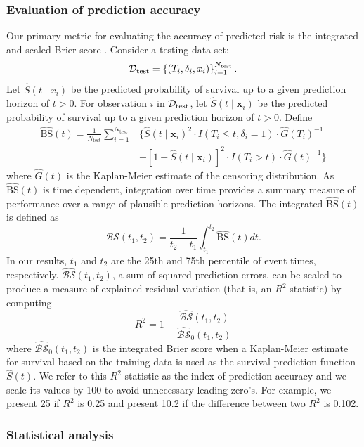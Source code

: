 \documentclass[twoside,11pt]{article}\usepackage[]{graphicx}\usepackage[]{xcolor}
\newcommand{\dataset}{{\cal D}}
\newcommand{\ie}{that is}
\newcommand{\bstat}{\widehat{\text{BS}}(t)}
\newcommand{\bsbar}{\mathcal{\widehat{BS}}(t_1, t_2)}
\newcommand{\bskap}{\mathcal{\widehat{BS}}_0(t_1, t_2)}
\newcommand{\ntest}{N_{\text{test}}}
\begin{document}
\subsubsection{Evaluation of prediction accuracy} \label{sec:prediction_accuracy}

Our primary metric for evaluating the accuracy of predicted risk is the integrated and scaled Brier score \citep{graf1999assessment}. Consider a testing data set:
$$\dataset_{\text{test}} = \left\{ (T_i, \delta_i, x_{i}) \right\}_{i=1}^{N_{\text{test}}}.$$
Let $\widehat{S}(t \mid x_i)$ be the predicted probability of survival up to a given prediction horizon of $t > 0$.
 For observation $i$ in $\dataset_{\text{test}}$, let $\widehat{S}(t \mid \bm{x}_i)$ be the predicted probability of survival up to a given prediction horizon of $t > 0$. Define \begin{align*}
\bstat = \frac{1}{\ntest} \sum_{i=1}^{\ntest} &\{ \widehat{S}(t \mid \bm{x}_i)^2 \cdot I(T_i \leq t, \delta_i = 1) \cdot \widehat{G}(T_i)^{-1} \\ &+ [1-\widehat{S}(t \mid \bm{x}_i)]^2 \cdot I(T_i > t) \cdot \widehat{G}(t)^{-1}\}
\end{align*} where $\widehat{G}(t)$ is the Kaplan-Meier estimate of the censoring distribution. As $\bstat$ is time dependent, integration over time provides a summary measure of performance over a range of plausible prediction horizons. The integrated $\bstat$ is defined as \begin{equation}
\bsbar = \frac{1}{t_2 - t_1}\int_{t_1}^{t_2} \widehat{\text{BS}}(t) dt.
\end{equation} In our results, $t_1$ and $t_2$ are the 25th and 75th percentile of event times, respectively. $\bsbar$, a sum of squared prediction errors, can be scaled to produce a measure of explained residual variation (\ie, an $R^2$ statistic) by computing \begin{equation}
R^2 = 1 - \frac{\bsbar}{\bskap}
\end{equation} where $\bskap$ is the integrated Brier score when a Kaplan-Meier estimate for survival based on the training data is used as the survival prediction function $\widehat{S}(t)$. We refer to this $R^2$ statistic as the index of prediction accuracy and we scale its values by 100 to avoid unnecessary leading zero's. For example, we present 25 if $R^2$ is 0.25 and present 10.2 if the difference between two $R^2$ is 0.102.

\subsubsection{Statistical analysis}
\end{document}
